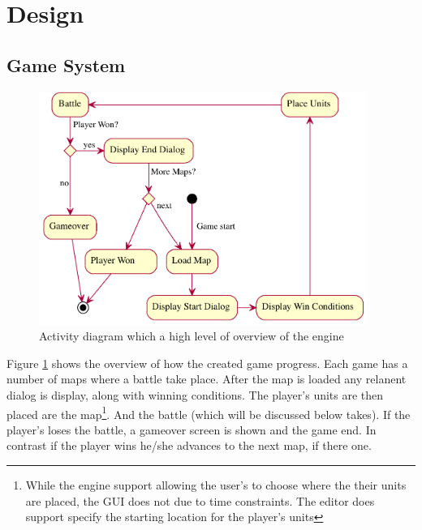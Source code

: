 \section{Design}

\subsection{Game System}

\begin{figure}[htbp]
	\centering
		\includegraphics[height=3in]{figures/game.pdf}
	\caption{Activity diagram which a high level of overview of the engine}
	\label{fig:figures_game}
\end{figure}

Figure \ref{fig:figures_game} shows the overview of how the created game progress.  Each game has a number of maps where a battle take place. After the map is loaded any relanent dialog is display, along with winning conditions. The player's units are then placed are the map\footnote{While the engine support allowing the user's to choose where the their units are placed, the GUI does not due to time constraints. The editor does support specify the starting location for the player's units}.  And the battle (which will be discussed below takes). If the player's loses the battle, a gameover screen is shown and the game end. In contrast if the player wins he/she advances to the next map, if there one.    


